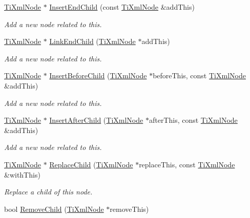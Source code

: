 \begin{DoxyCompactItemize}
\item 
\hyperlink{class_ti_xml_node}{Ti\+Xml\+Node} $\ast$ \hyperlink{class_ti_xml_node_af287a913ce46d8dbf7ef24fec69bbaf0}{Insert\+End\+Child} (const \hyperlink{class_ti_xml_node}{Ti\+Xml\+Node} \&add\+This)
\begin{DoxyCompactList}\small\item\em Add a new node related to this. \end{DoxyCompactList}\item 
\hyperlink{class_ti_xml_node}{Ti\+Xml\+Node} $\ast$ \hyperlink{class_ti_xml_node_a1a881212554b759865f6cac79a851d38}{Link\+End\+Child} (\hyperlink{class_ti_xml_node}{Ti\+Xml\+Node} $\ast$add\+This)
\begin{DoxyCompactList}\small\item\em Add a new node related to this. \end{DoxyCompactList}\item 
\hyperlink{class_ti_xml_node}{Ti\+Xml\+Node} $\ast$ \hyperlink{class_ti_xml_node_a71e54e393336382bc9875f64aab5cb15}{Insert\+Before\+Child} (\hyperlink{class_ti_xml_node}{Ti\+Xml\+Node} $\ast$before\+This, const \hyperlink{class_ti_xml_node}{Ti\+Xml\+Node} \&add\+This)
\begin{DoxyCompactList}\small\item\em Add a new node related to this. \end{DoxyCompactList}\item 
\hyperlink{class_ti_xml_node}{Ti\+Xml\+Node} $\ast$ \hyperlink{class_ti_xml_node_a274db3292218202805c093f66a964cb5}{Insert\+After\+Child} (\hyperlink{class_ti_xml_node}{Ti\+Xml\+Node} $\ast$after\+This, const \hyperlink{class_ti_xml_node}{Ti\+Xml\+Node} \&add\+This)
\begin{DoxyCompactList}\small\item\em Add a new node related to this. \end{DoxyCompactList}\item 
\hyperlink{class_ti_xml_node}{Ti\+Xml\+Node} $\ast$ \hyperlink{class_ti_xml_node_a543208c2c801c84a213529541e904b9f}{Replace\+Child} (\hyperlink{class_ti_xml_node}{Ti\+Xml\+Node} $\ast$replace\+This, const \hyperlink{class_ti_xml_node}{Ti\+Xml\+Node} \&with\+This)
\begin{DoxyCompactList}\small\item\em Replace a child of this node. \end{DoxyCompactList}\item 
bool \hyperlink{class_ti_xml_node_ae19d8510efc90596552f4feeac9a8fbf}{Remove\+Child} (\hyperlink{class_ti_xml_node}{Ti\+Xml\+Node} $\ast$remove\+This)\hypertarget{class_ti_xml_node_ae19d8510efc90596552f4feeac9a8fbf}{}\label{class_ti_xml_node_ae19d8510efc90596552f4feeac9a8fbf}


\end{DoxyCompactItemize}
